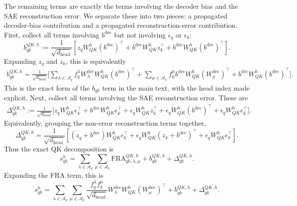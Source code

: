 \documentclass[10pt]{article}
\theoremstyle{definition}
\newcommand{\1}{\mathbf{1}}
\newcommand{\dec}{\mathrm{dec}}
\begin{document}
The remaining terms are exactly the terms involving the decoder bias and the SAE reconstruction error. We separate these into two pieces: a propagated decoder-bias contribution and a propagated reconstruction-error contribution. First, collect all terms involving $b^\dec$ but not involving $\epsilon_q$ or $\epsilon_k$:
\begin{equation}
    b_{qk}^{QK,h}
    :=
    \frac{1}{\sqrt{d_{\text{head}}}}
    \left[
        z_q W_{QK}^h (b^\dec)^\top
        +
        b^\dec W_{QK}^h z_k^\top
        +
        b^\dec W_{QK}^h (b^\dec)^\top
    \right].
\end{equation}
Expanding $z_q$ and $z_k$, this is equivalently
\begin{align}
    b_{qk}^{QK,h}
    =
    \frac{1}{\sqrt{d_{\text{head}}}}
    \bigg[
    \sum_{\lambda \in \mathcal A_q}
    f_q^\lambda
    W_\lambda^\dec
    W_{QK}^h
    (b^\dec)^\top
    +
    \sum_{\mu \in \mathcal A_k}
    f_k^\mu
    b^\dec
    W_{QK}^h
    (W_\mu^\dec)^\top
    +
    b^\dec
    W_{QK}^h
    (b^\dec)^\top
    \bigg].
\end{align}
This is the exact form of the $b_{qk}$ term in the main text, with the head index made explicit. Next, collect all terms involving the SAE reconstruction error. These are
\begin{align}
    \Delta_{qk}^{QK,h}
    :=
    \frac{1}{\sqrt{d_{\text{head}}}}
    \bigg[
    z_q W_{QK}^h \epsilon_k^\top
    +
    b^\dec W_{QK}^h \epsilon_k^\top
    +
    \epsilon_q W_{QK}^h z_k^\top
    +
    \epsilon_q W_{QK}^h (b^\dec)^\top
    +
    \epsilon_q W_{QK}^h \epsilon_k^\top
    \bigg].
\end{align}
Equivalently, grouping the non-error reconstruction terms together,
\begin{equation}
    \Delta_{qk}^{QK,h}
    =
    \frac{1}{\sqrt{d_{\text{head}}}}
    \left[
        (z_q + b^\dec)W_{QK}^h\epsilon_k^\top
        +
        \epsilon_q W_{QK}^h(z_k + b^\dec)^\top
        +
        \epsilon_q W_{QK}^h\epsilon_k^\top
    \right].
\end{equation}
Thus the exact QK decomposition is
\begin{equation}
\boxed{
    s_{qk}^h
    =
    \sum_{\lambda \in \mathcal A_q}
    \sum_{\mu \in \mathcal A_k}
    \mathrm{FRA}_{qk,\lambda,\mu}^{QK,h}
    +
    b_{qk}^{QK,h}
    +
    \Delta_{qk}^{QK,h}.
}
\end{equation}
Expanding the FRA term, this is
\begin{equation}
\boxed{
    s_{qk}^h
    =
    \sum_{\lambda \in \mathcal A_q}
    \sum_{\mu \in \mathcal A_k}
    \frac{f_q^\lambda f_k^\mu}{\sqrt{d_{\text{head}}}}
    W_\lambda^\dec
    W_{QK}^h
    (W_\mu^\dec)^\top
    +
    b_{qk}^{QK,h}
    +
    \Delta_{qk}^{QK,h}.
}
\end{equation}
\end{document}
